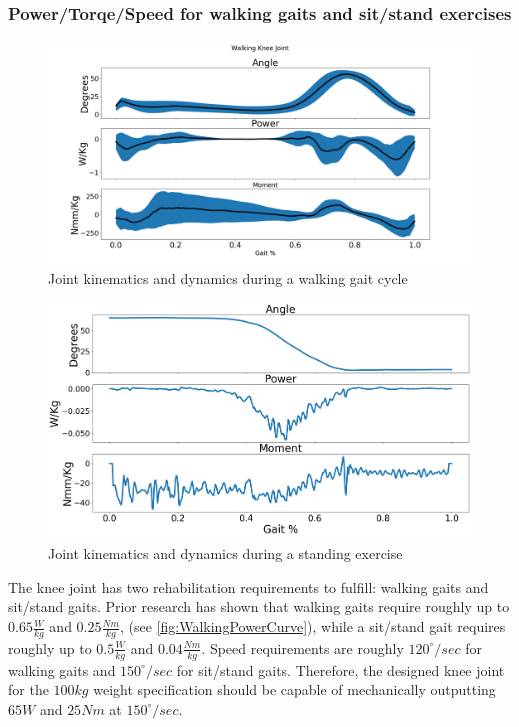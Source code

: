 \subsubsection{Power/Torqe/Speed for walking gaits and sit/stand exercises}

\begin{figure}[ht!]
    \centering
    \includegraphics[width=\linewidth]{Figures/Design/WalkingPowerCurveKnee.png}
    \caption{Joint kinematics and dynamics during a walking gait cycle \cite{SpringWrapClutchKnee}}
    \label{fig:WalkingPowerCurve}
\end{figure}

\begin{figure}[ht!]
    \centering
    \includegraphics[width=\linewidth]{Figures/Design/SitStandPowerCurveKnee.png}
    \caption{Joint kinematics and dynamics during a standing exercise \cite{SpringWrapClutchKnee}}
    \label{fig:SitStandPowerCurve}
\end{figure}

The knee joint has two rehabilitation requirements to fulfill: walking gaits and sit/stand gaits. Prior research has shown that walking gaits require roughly up to \(0.65 \frac{W}{kg}\) and \(0.25\frac{Nm}{kg}\), (see \autoref{fig:WalkingPowerCurve}), while a sit/stand gait requires roughly up to \(0.5 \frac{W}{kg}\) and \(0.04 \frac{Nm}{kg}\).  Speed requirements are roughly \(120^\circ/sec\) for walking gaits and \(150^\circ/sec\) for sit/stand gaits. Therefore, the designed knee joint for the \(100 kg\) weight specification should be capable of mechanically outputting \(65 W\) and \(25 Nm\) at \(150^\circ/sec\).

